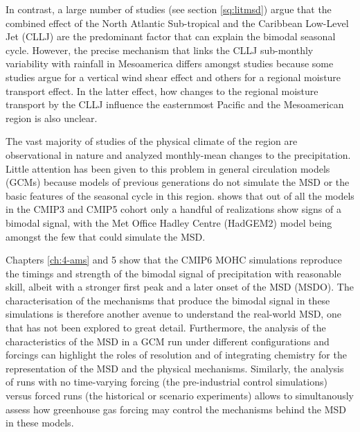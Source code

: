 In contrast, a large number of studies (see section \ref{sq:litmsd}) argue that the combined effect of the North Atlantic Sub-tropical and the Caribbean Low-Level Jet (CLLJ) are the predominant factor that can explain the bimodal seasonal cycle. However, the precise mechanism that links the CLLJ sub-monthly variability with rainfall in Mesoamerica differs amongst studies because some studies argue for a vertical wind shear effect and others for a regional moisture transport effect. In the latter effect, how changes to the regional moisture transport by the CLLJ influence the easternmost Pacific and the Mesoamerican region is also unclear.



  The vast majority of studies of the physical climate of the region are observational in nature and analyzed monthly-mean changes to the precipitation. 
Little attention has been given to this problem in general circulation models (GCMs) because models of previous generations do not simulate the MSD or the basic features of the seasonal cycle in this region. \cite{ryu2014} shows that out of all the models in the CMIP3 and CMIP5 cohort only a handful of realizations show signs of a bimodal signal, with the Met Office Hadley Centre (HadGEM2) model being amongst the few that could simulate the MSD. 




 Chapters \ref{ch:4-ams} and 5 show that the CMIP6 MOHC simulations reproduce the timings and strength of the bimodal signal of precipitation with reasonable skill, albeit with a stronger first peak and a later onset of the MSD (MSDO). 
 The characterisation of the mechanisms that produce the bimodal signal in these simulations is therefore another avenue to understand the real-world MSD, one that has not been explored to great detail. Furthermore, the analysis of the characteristics of the MSD in a GCM run under different configurations and forcings can highlight the roles of resolution and of integrating chemistry for the representation of the MSD and the physical mechanisms. Similarly, the analysis of runs with no time-varying forcing (the pre-industrial control simulations) versus forced runs (the historical or scenario experiments) allows to simultanously assess how greenhouse gas forcing may control the mechanisms behind the MSD in these models.  
 
